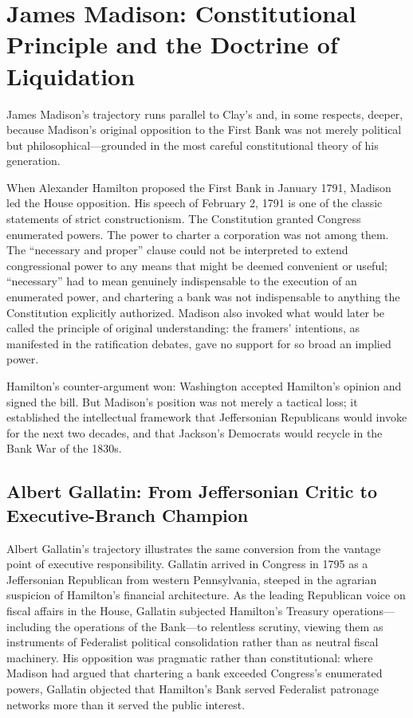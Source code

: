 \documentclass[12pt]{article}
\begin{document}
\section{James Madison: Constitutional Principle and the Doctrine of
         Liquidation}

James Madison's trajectory runs parallel to Clay's and, in some respects,
deeper, because Madison's original opposition to the First Bank was not
merely political but philosophical---grounded in the most careful
constitutional theory of his generation.

When Alexander Hamilton proposed the First Bank in January 1791,
Madison led the House opposition.  His speech of February 2, 1791 is one
of the classic statements of strict constructionism.  The Constitution
granted Congress enumerated powers.  The power to charter a corporation
was not among them.  The ``necessary and proper'' clause could not
be interpreted to extend congressional power to any means that might be
deemed convenient or useful; ``necessary'' had to mean genuinely
indispensable to the execution of an enumerated power, and chartering a
bank was not indispensable to anything the Constitution explicitly
authorized.  Madison also invoked what would later be called
the principle of original understanding: the framers'
intentions, as manifested in the ratification debates, gave no
support for so broad an implied power.

Hamilton's counter-argument won: Washington accepted Hamilton's opinion
and signed the bill.  But Madison's position was not merely a tactical
loss; it established the intellectual framework that Jeffersonian
Republicans would invoke for the next two decades, and that Jackson's
Democrats would recycle in the Bank War of the 1830s.

\subsection{Albert Gallatin: From Jeffersonian Critic to
             Executive-Branch Champion}

Albert Gallatin's trajectory illustrates the same conversion from the
vantage point of executive responsibility.  Gallatin arrived in Congress
in 1795 as a Jeffersonian Republican from western Pennsylvania, steeped
in the agrarian suspicion of Hamilton's financial architecture.  As the
leading Republican voice on fiscal affairs in the House, Gallatin
subjected Hamilton's Treasury operations---including the operations of
the Bank---to relentless scrutiny, viewing them as instruments of
Federalist political consolidation rather than as neutral fiscal
machinery.  His opposition was pragmatic rather than constitutional:
where Madison had argued that chartering a bank exceeded Congress's
enumerated powers, Gallatin objected that Hamilton's Bank served
Federalist patronage networks more than it served the public interest.
\end{document}
